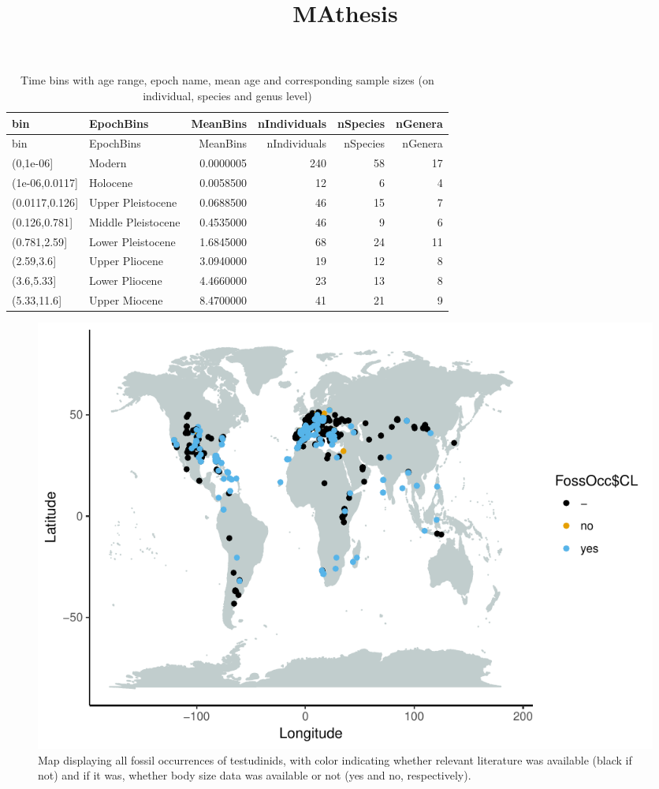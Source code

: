 \documentclass[]{article}
\title{MAthesis}
\author{}
\date{}
\begin{document}
\maketitle

\begin{longtable}[]{@{}llrrrr@{}}
\caption{Time bins with age range, epoch name, mean age and
corresponding sample sizes (on individual, species and genus
level)}\tabularnewline
\toprule
bin & EpochBins & MeanBins & nIndividuals & nSpecies &
nGenera\tabularnewline
\midrule
\endfirsthead
\toprule
bin & EpochBins & MeanBins & nIndividuals & nSpecies &
nGenera\tabularnewline
\midrule
\endhead
(0,1e-06{]} & Modern & 0.0000005 & 240 & 58 & 17\tabularnewline
(1e-06,0.0117{]} & Holocene & 0.0058500 & 12 & 6 & 4\tabularnewline
(0.0117,0.126{]} & Upper Pleistocene & 0.0688500 & 46 & 15 &
7\tabularnewline
(0.126,0.781{]} & Middle Pleistocene & 0.4535000 & 46 & 9 &
6\tabularnewline
(0.781,2.59{]} & Lower Pleistocene & 1.6845000 & 68 & 24 &
11\tabularnewline
(2.59,3.6{]} & Upper Pliocene & 3.0940000 & 19 & 12 & 8\tabularnewline
(3.6,5.33{]} & Lower Pliocene & 4.4660000 & 23 & 13 & 8\tabularnewline
(5.33,11.6{]} & Upper Miocene & 8.4700000 & 41 & 21 & 9\tabularnewline
\bottomrule
\end{longtable}

\begin{figure}[htbp]
\centering
\includegraphics{MA_JJ_files/figure-latex/Map fossil occurrences-1.pdf}
\caption{Map displaying all fossil occurrences of testudinids, with
color indicating whether relevant literature was available (black if
not) and if it was, whether body size data was available or not (yes and
no, respectively).}
\end{figure}
\end{document}
